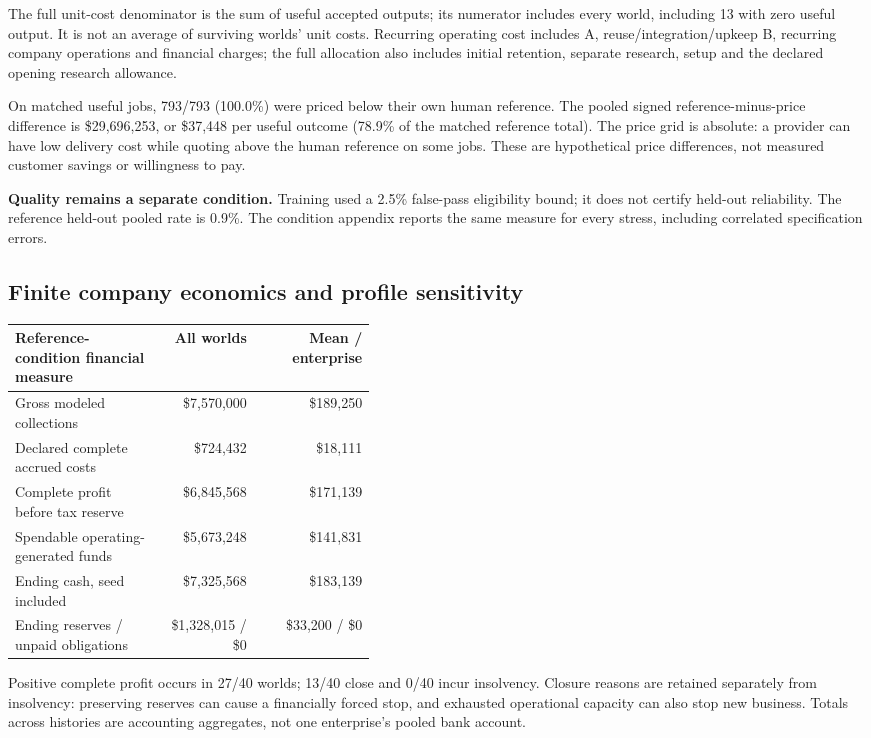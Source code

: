 \par\smallskip The full unit-cost denominator is the sum of useful accepted outputs; its numerator includes every world, including 13 with zero useful output. It is not an average of surviving worlds' unit costs. Recurring operating cost includes A, reuse/integration/upkeep B, recurring company operations and financial charges; the full allocation also includes initial retention, separate research, setup and the declared opening research allowance.

On matched useful jobs, 793/793 (100.0\%) were priced below their own human reference. The pooled signed reference-minus-price difference is \$29,696,253, or \$37,448 per useful outcome (78.9\% of the matched reference total). The price grid is absolute: a provider can have low delivery cost while quoting above the human reference on some jobs. These are hypothetical price differences, not measured customer savings or willingness to pay.

\textbf{Quality remains a separate condition.} Training used a 2.5\% false-pass eligibility bound; it does not certify held-out reliability. The reference held-out pooled rate is 0.9\%. The condition appendix reports the same measure for every stress, including correlated specification errors.

\subsection{Finite company economics and profile sensitivity}

{\small
\setlength{\tabcolsep}{4pt}
\begin{tabular}{@{}p{0.42\linewidth}rr@{}}
\toprule
Reference-condition financial measure & All worlds & Mean / enterprise \\
\midrule
Gross modeled collections & \$7,570,000 & \$189,250 \\
Declared complete accrued costs & \$724,432 & \$18,111 \\
Complete profit before tax reserve & \$6,845,568 & \$171,139 \\
Spendable operating-generated funds & \$5,673,248 & \$141,831 \\
Ending cash, seed included & \$7,325,568 & \$183,139 \\
Ending reserves / unpaid obligations & \$1,328,015 / \$0 & \$33,200 / \$0 \\
\bottomrule
\end{tabular}
}

\par\smallskip Positive complete profit occurs in 27/40 worlds; 13/40 close and 0/40 incur insolvency. Closure reasons are retained separately from insolvency: preserving reserves can cause a financially forced stop, and exhausted operational capacity can also stop new business. Totals across histories are accounting aggregates, not one enterprise's pooled bank account.

